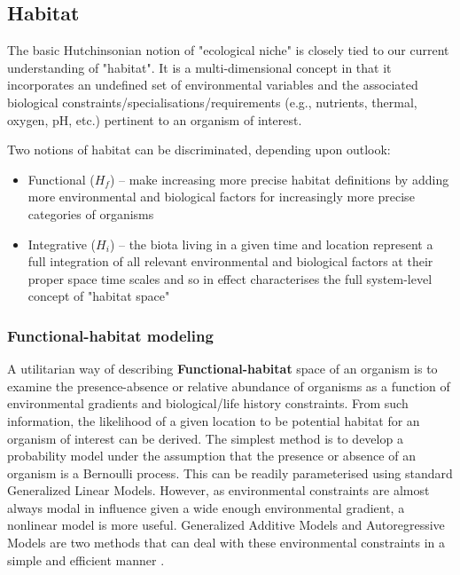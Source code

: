 \documentclass[letterpaper,portrait,11pt]{scrartcl}
\numberwithin{equation}{section}    %
\numberwithin{figure}{section}    %
\numberwithin{table}{section}       %
\begin{document}
\subsection{Habitat}

The basic Hutchinsonian notion of "ecological niche" is closely tied to our current understanding of "habitat". It is a multi-dimensional concept in that it incorporates an undefined set of  environmental variables and the associated biological constraints/specialisations/requirements (e.g., nutrients, thermal, oxygen, pH, etc.) pertinent to an organism of interest. 

Two notions of habitat can be discriminated, depending upon outlook: 

\begin{itemize}
  \item Functional ($H_f$) -- make increasing more precise habitat definitions by adding more environmental and biological factors for increasingly more precise categories of organisms   
  \item Integrative ($H_i$) -- the biota living in a given time and location represent a full integration of all relevant environmental and biological factors at their proper space time scales and so in effect characterises the full system-level concept of "habitat space" 
\end{itemize}


\subsubsection{Functional-habitat modeling}
\label{sec:habitatSpecies}

A utilitarian way of describing \textbf{Functional-habitat} space of an organism is to examine the presence-absence or relative abundance of organisms as a function of environmental gradients and biological/life history constraints. From such information, the likelihood of a given location to be potential habitat for an organism of interest can be derived. The simplest method is to develop a probability model under the assumption that the presence or absence of an organism is a Bernoulli process. This can be readily parameterised using standard Generalized Linear Models. However, as environmental constraints are almost always modal in influence given a wide enough environmental gradient, a nonlinear model is more useful. Generalized Additive Models and Autoregressive Models are two methods that can deal with these environmental constraints in a simple and efficient manner \parencite{choi:2010}.  
\end{document}
